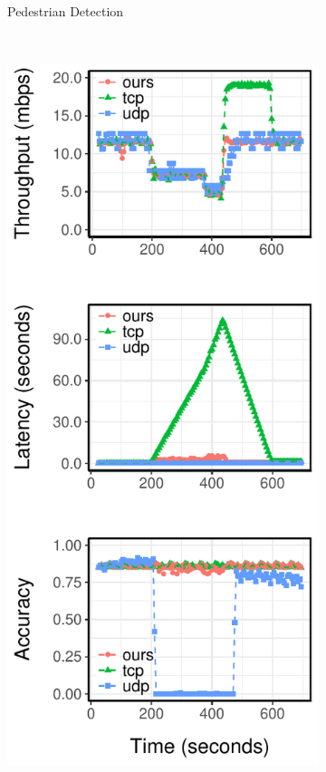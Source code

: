 \begin{figure}[!htb]
\begin{subfigure}[t]{0.33\textwidth}
    \caption{Pedestrian Detection}
    \label{fig:pd-runtime}
  \end{subfigure}
  ~
  \begin{subfigure}[t]{0.33\textwidth}
    \centering
    \includegraphics[width=\textwidth]{figures/ped-runtime-verticle.pdf}

\end{subfigure}
\end{figure}
